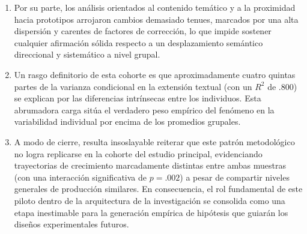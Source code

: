 \documentclass[12pt]{article}
\begin{document}
\begin{enumerate}
		\item Por su parte, los análisis orientados al contenido temático y a la proximidad hacia prototipos arrojaron cambios demasiado tenues, marcados por una alta dispersión y carentes de factores de corrección, lo que impide sostener cualquier afirmación sólida respecto a un desplazamiento semántico direccional y sistemático a nivel grupal.
		
		\item Un rasgo definitorio de esta cohorte es que aproximadamente cuatro quintas partes de la varianza condicional en la extensión textual (con un $R^2$ de $.800$) se explican por las diferencias intrínsecas entre los individuos. Esta abrumadora carga sitúa el verdadero peso empírico del fenómeno en la variabilidad individual por encima de los promedios grupales.
		
		\item A modo de cierre, resulta insoslayable reiterar que este patrón metodológico no logra replicarse en la cohorte del estudio principal, evidenciando trayectorias de crecimiento marcadamente distintas entre ambas muestras (con una interacción significativa de $p = .002$) a pesar de compartir niveles generales de producción similares. En consecuencia, el rol fundamental de este piloto dentro de la arquitectura de la investigación se consolida como una etapa inestimable para la generación empírica de hipótesis que guiarán los diseños experimentales futuros.
	\end{enumerate}
	
\end{document}
